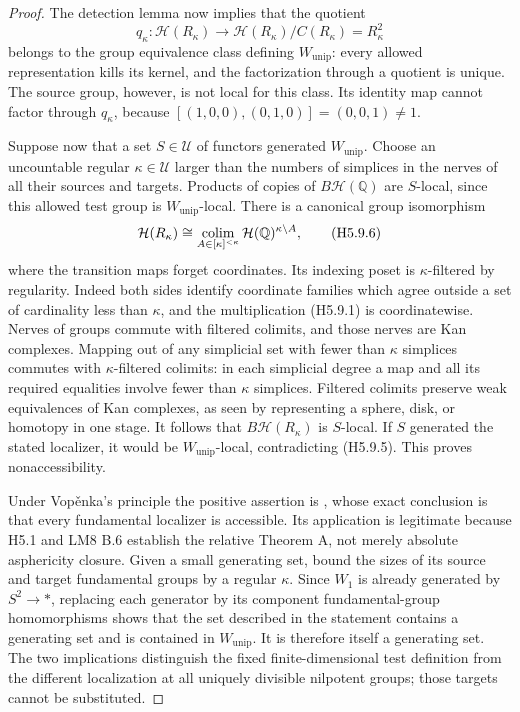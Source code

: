 \begin{proof}
The detection lemma now implies that the quotient
\[
 q_\kappa:\mathcal H(R_\kappa)\longrightarrow
                \mathcal H(R_\kappa)/C(R_\kappa)=R_\kappa^2
                                                               \tag{H5.9.5}
\]
belongs to the group equivalence class defining
$W_{\mathrm{unip}}$: every allowed representation kills its
kernel, and the factorization through a quotient is unique.
The source group, however, is not local for this class.
Its identity map cannot factor through $q_\kappa$, because
$[(1,0,0),(0,1,0)]=(0,0,1)\ne1$.

Suppose now that a set $S\in\mathcal U$ of functors generated
$W_{\mathrm{unip}}$. Choose an uncountable regular
$\kappa\in\mathcal U$ larger than the numbers of simplices
in the nerves of all their sources and targets.
Products of copies of $B\mathcal H(\mathbb Q)$ are $S$-local,
since this allowed test group is $W_{\mathrm{unip}}$-local.
There is a canonical group isomorphism
\[
 \mathcal H(R_\kappa)\cong
  \operatorname*{colim}_{A\in[\kappa]^{<\kappa}}
              \mathcal H(\mathbb Q)^{\kappa\setminus A},
                                                               \tag{H5.9.6}
\]
where the transition maps forget coordinates. Its indexing
poset is $\kappa$-filtered by regularity. Indeed both sides
identify coordinate families which agree outside a set of
cardinality less than $\kappa$, and the multiplication
(H5.9.1) is coordinatewise. Nerves of groups commute with
filtered colimits, and those nerves are Kan complexes.
Mapping out of any simplicial set with fewer than $\kappa$
simplices commutes with $\kappa$-filtered colimits: in each
simplicial degree a map and all its required equalities
involve fewer than $\kappa$ simplices. Filtered colimits
preserve weak equivalences of Kan complexes, as seen by
representing a sphere, disk, or homotopy in one stage.
It follows that $B\mathcal H(R_\kappa)$ is $S$-local.
If $S$ generated the stated localizer, it would be
$W_{\mathrm{unip}}$-local, contradicting (H5.9.5).
This proves nonaccessibility.

Under Vop\v enka's principle the positive assertion is
\citet[Scholium 4.2.17]{EH5Cisinski2006}, whose exact
conclusion is that every fundamental localizer is accessible.
Its application is legitimate because H5.1 and LM8 B.6
establish the relative Theorem A, not merely absolute
asphericity closure. Given a small generating set, bound
the sizes of its source and target fundamental groups by
a regular $\kappa$. Since $W_1$ is already generated by
$S^2\to *$, replacing each generator by its component
fundamental-group homomorphisms shows that the set described
in the statement contains a generating set and is contained
in $W_{\mathrm{unip}}$. It is therefore itself a generating set.
The two implications distinguish the fixed finite-dimensional
test definition from the different localization at all uniquely
divisible nilpotent groups; those targets cannot be substituted.
\end{proof}

